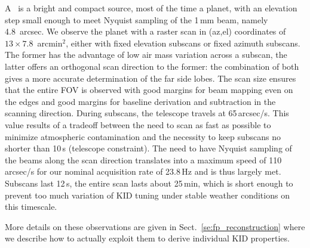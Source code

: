 A \bm\ is  a bright and compact
source, most of the time a planet, with
an elevation step small enough to meet Nyquist sampling of the 1\,mm beam,
namely 4.8~arcsec. We observe the planet with a raster scan in (az,el)
coordinates of $13\times7.8$~arcmin$^2$, either with fixed elevation subscans or
fixed azimuth subscans. The former has the advantage of low air mass variation
across a subscan, the latter offers an orthogonal scan direction to the former:
the combination of both gives a more accurate determination of the far side
lobes. The scan size ensures that the entire FOV is observed with good margins
for beam mapping even on the edges and good margins for baseline derivation and
subtraction in the scanning direction. During subscans, the telescope travels at
65\,arcsec/s. This value results of a tradeoff between the need to scan as
fast as possible to minimize atmospheric contamination and the
necessity to keep subscans no shorter than 10\,s (telescope
constraint). The need to have Nyquist sampling of
the beams along the scan direction translates into a maximum speed of 110\,arcsec/s
for our nominal acquisition rate of 23.8\,Hz and is thus largely met. Subscans
last 12\,s, the entire scan lasts about 25\,min, which is short enough to prevent
too much variation of KID tuning under stable weather conditions on this
timescale.

More details on these observations are given in Sect.~\ref{se:fp_reconstruction}
where we describe how to actually exploit them to derive individual KID
properties.
